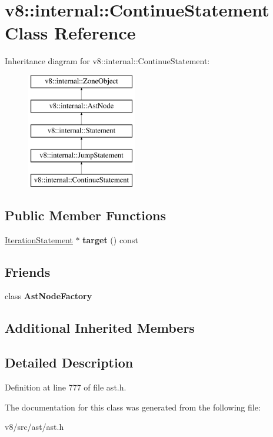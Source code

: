 \hypertarget{classv8_1_1internal_1_1ContinueStatement}{}\section{v8\+:\+:internal\+:\+:Continue\+Statement Class Reference}
\label{classv8_1_1internal_1_1ContinueStatement}
Inheritance diagram for v8\+:\+:internal\+:\+:Continue\+Statement\+:\begin{figure}[H]
\begin{center}
\leavevmode
\includegraphics[height=5.000000cm]{classv8_1_1internal_1_1ContinueStatement}
\end{center}
\end{figure}
\subsection*{Public Member Functions}
\begin{DoxyCompactItemize}
\item 
\mbox{\label{classv8_1_1internal_1_1ContinueStatement_ab2864ce0df5ada8e8944e313b8d30c20}} 
\mbox{\hyperlink{classv8_1_1internal_1_1IterationStatement}{Iteration\+Statement}} $\ast$ {\bfseries target} () const
\end{DoxyCompactItemize}
\subsection*{Friends}
\begin{DoxyCompactItemize}
\item 
\mbox{\label{classv8_1_1internal_1_1ContinueStatement_a8d587c8ad3515ff6433eb83c578e795f}} 
class {\bfseries Ast\+Node\+Factory}
\end{DoxyCompactItemize}
\subsection*{Additional Inherited Members}


\subsection{Detailed Description}


Definition at line 777 of file ast.\+h.



The documentation for this class was generated from the following file\+:\begin{DoxyCompactItemize}
\item 
v8/src/ast/ast.\+h\end{DoxyCompactItemize}
